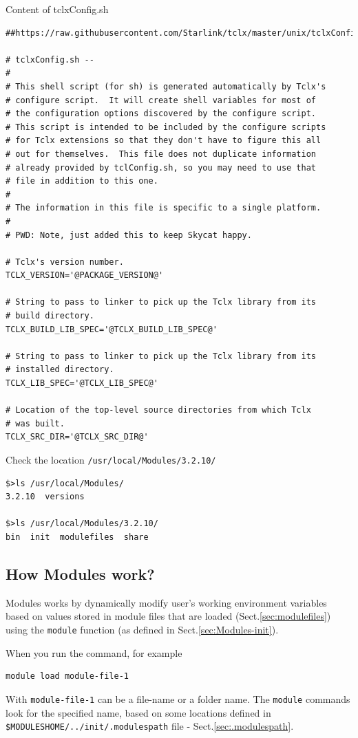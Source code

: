 Content of tclxConfig.sh
{\tiny
\begin{verbatim}
##https://raw.githubusercontent.com/Starlink/tclx/master/unix/tclxConfig.sh.in

# tclxConfig.sh --
# 
# This shell script (for sh) is generated automatically by Tclx's
# configure script.  It will create shell variables for most of
# the configuration options discovered by the configure script.
# This script is intended to be included by the configure scripts
# for Tclx extensions so that they don't have to figure this all
# out for themselves.  This file does not duplicate information
# already provided by tclConfig.sh, so you may need to use that
# file in addition to this one.
#
# The information in this file is specific to a single platform.
#
# PWD: Note, just added this to keep Skycat happy.

# Tclx's version number.
TCLX_VERSION='@PACKAGE_VERSION@'

# String to pass to linker to pick up the Tclx library from its
# build directory.
TCLX_BUILD_LIB_SPEC='@TCLX_BUILD_LIB_SPEC@'

# String to pass to linker to pick up the Tclx library from its
# installed directory.
TCLX_LIB_SPEC='@TCLX_LIB_SPEC@'

# Location of the top-level source directories from which Tclx
# was built.  
TCLX_SRC_DIR='@TCLX_SRC_DIR@'
\end{verbatim}
}

Check the location \verb!/usr/local/Modules/3.2.10/!
\begin{verbatim}
$>ls /usr/local/Modules/
3.2.10  versions

$>ls /usr/local/Modules/3.2.10/
bin  init  modulefiles  share
\end{verbatim}

\subsection{How Modules work?}

Modules works by dynamically modify user's working environment variables based
on values stored in module files that are loaded (Sect.\ref{sec:modulefiles})
using the \verb!module! function (as defined in Sect.\ref{sec:Modules-init}).

When you run the command, for example
\begin{verbatim}
module load module-file-1
\end{verbatim}
With \verb!module-file-1! can be a file-name or a folder name. The \verb!module!
commands look for the specified name, based on some locations defined in 
\verb!$MODULESHOME/../init/.modulespath! file -
Sect.\ref{sec:.modulespath}.

